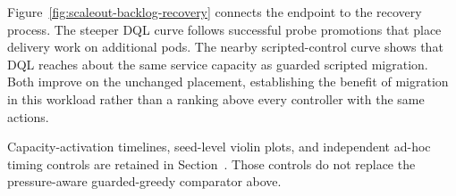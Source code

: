 Figure~\ref{fig:scaleout-backlog-recovery} connects the endpoint to the
recovery process. The steeper DQL curve follows successful probe promotions
that place delivery work on additional pods. The nearby scripted-control curve shows that DQL reaches about the same
service capacity as guarded scripted migration. Both improve on the unchanged
placement, establishing the benefit of migration in this workload rather than
a ranking above every controller with the same actions.

Capacity-activation timelines, seed-level violin plots, and independent
ad-hoc timing controls are retained in Section~. Those controls do not replace the
pressure-aware guarded-greedy comparator above.
